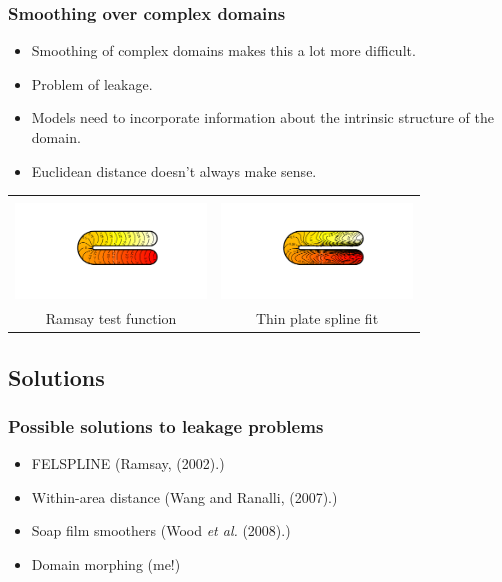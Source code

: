 \documentclass[ignorenonframetext]{beamer} %
\newcommand{\bc}{\begin{center}}
\newcommand{\ec}{\end{center}}
\newcommand{\bi}{\begin{itemize}}
\newcommand{\ei}{\end{itemize}}
\begin{document}
\begin{frame}
	\frametitle{Smoothing over complex domains}
       \bi
         \item Smoothing of complex domains makes this a lot more difficult.
         \item Problem of leakage.
         \item Models need to incorporate information about the intrinsic structure of the domain.
         \item Euclidean distance doesn't always make sense.
       \ei
       \bc\begin{tabular}{@{}cc}
          & \\
          \includegraphics[width=2in, trim=1in 1in 1in 1in]{figs/ramsayhorseshoe} & \includegraphics[width=2in, trim=1in 1in 1in 1in]{figs/leakageexample}\\
          Ramsay test function & Thin plate spline fit\\
       \end{tabular}\ec
\end{frame}

\subsection{Solutions}

\begin{frame}
	\frametitle{Possible solutions to leakage problems}
       \bi
         \item FELSPLINE (Ramsay, (2002).)
         \item Within-area distance (Wang and Ranalli, (2007).)
         \item Soap film smoothers (Wood \emph{et al.} (2008).) 
         \item Domain morphing (me!)
        \ei
\end{frame}
\end{document}
